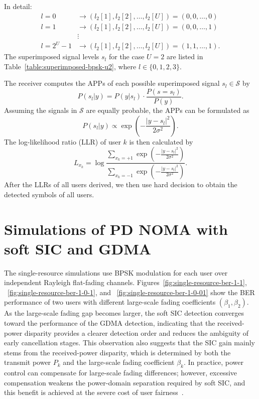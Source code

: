 In detail: 
\begin{equation}
  \begin{aligned}
    l=0 &\rightarrow (l_2[1], l_2[2], \ldots, l_2[U]) = (0, 0, \ldots, 0) \\
    l=1 &\rightarrow (l_2[1], l_2[2], \ldots, l_2[U]) = (0, 0, \ldots, 1) \\
    &\vdots \\
    l=2^U-1 &\rightarrow (l_2[1], l_2[2], \ldots, l_2[U]) = (1, 1, \ldots, 1).
  \end{aligned}
\end{equation}
The superimposed signal levels $s_l$ for the case $U=2$ are listed in Table~\ref{table:superimposed-bpsk-u2}, where $l \in \{0,1,2,3\}$.

The receiver computes the APPs of each possible superimposed signal $s_l\in\mathcal{S}$ by
\begin{equation}
    P(s_l|y) = P(y|s_l) \cdot \frac{P(s=s_l)}{P(y)}. 
\end{equation}
Assuming the signals in $\mathcal{S}$ are equally probable, the APPs can be formulated as
\begin{equation}
    P(s_l|y)  \propto\exp\left(-\frac{|y-s_l|^2}{2\sigma^2}\right).
\end{equation}
The log-likelihood ratio (LLR) of user $k$ is then calculated by
\begin{equation}
    L_{x_k} =
    \log
    \frac{
    \sum\limits_{ {x_k}=+1}
    \exp\left(-\frac{|y-s_l|^2}{2\sigma^2}\right)
    }{
    \sum\limits_{ {x_k}=-1}
    \exp\left(-\frac{|y-s_l|^2}{2\sigma^2}\right)
    }.
\end{equation}
After the LLRs of all users derived, we then use hard decision to obtain the detected symbols of all users.


\section{Simulations of PD NOMA with soft SIC and GDMA}
The single-resource simulations use BPSK modulation for each user over independent Rayleigh flat-fading channels. Figures~\ref{fig:single-resource-ber-1-1}, ~\ref{fig:single-resource-ber-1-0-1}, and ~\ref{fig:single-resource-ber-1-0-01} show the BER performance of two users with different large-scale fading coefficients $(\beta_1, \beta_2)$. As the large-scale fading gap becomes larger, the soft SIC detection converges toward the performance of the GDMA detection, indicating that the received-power disparity provides a clearer detection order and reduces the ambiguity of early cancellation stages. 
This observation also suggests that the SIC gain mainly stems from the received-power disparity, which is determined by both the transmit power $P_k$ and the large-scale fading coefficient $\beta_k$. 
In practice, power control can compensate for large-scale fading differences; however, excessive compensation weakens the power-domain separation required by soft SIC, and this benefit is achieved at the severe cost of user fairness~\cite{ding2015impact}.   

